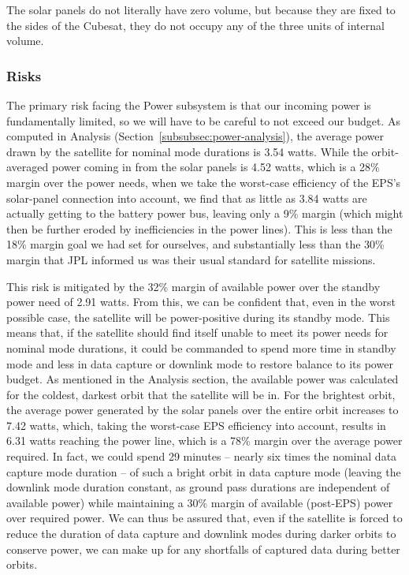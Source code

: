 \documentclass[12pt]{article}
\begin{document}
The solar panels do not literally have zero volume, but because they are fixed to the sides of the Cubesat, they do not occupy any of the three units of internal volume.

			\subsubsection{Risks}

The primary risk facing the Power subsystem is that our incoming power is fundamentally limited, so we will have to be careful to not exceed our budget.  As computed in Analysis (Section~\ref{subsubsec:power-analysis}), the average power drawn by the satellite for nominal mode durations is 3.54 watts.  While the orbit-averaged power coming in from the solar panels is 4.52 watts, which is a 28\% margin over the power needs, when we take the worst-case efficiency of the EPS's solar-panel connection into account\cite{EPS manual}, we find that as little as 3.84 watts are actually getting to the battery power bus, leaving only a 9\% margin (which might then be further eroded by inefficiencies in the power lines).  This is less than the 18\% margin goal we had set for ourselves, and substantially less than the 30\% margin that JPL informed us was their usual standard for satellite missions.

This risk is mitigated by the 32\% margin of available power over the standby power need of 2.91 watts.  From this, we can be confident that, even in the worst possible case, the satellite will be power-positive during its standby mode.  This means that, if the satellite should find itself unable to meet its power needs for nominal mode durations, it could be commanded to spend more time in standby mode and less in data capture or downlink mode to restore balance to its power budget.  As mentioned in the Analysis section, the available power was calculated for the coldest, darkest orbit that the satellite will be in.  For the brightest orbit, the average power generated by the solar panels over the entire orbit increases to 7.42 watts, which, taking the worst-case EPS efficiency into account, results in 6.31 watts reaching the power line, which is a 78\% margin over the average power required.  In fact, we could spend 29 minutes -- nearly six times the nominal data capture mode duration -- of such a bright orbit in data capture mode (leaving the downlink mode duration constant, as ground pass durations are independent of available power) while maintaining a 30\% margin of available (post-EPS) power over required power.  We can thus be assured that, even if the satellite is forced to reduce the duration of data capture and downlink modes during darker orbits to conserve power, we can make up for any shortfalls of captured data during better orbits.
\end{document}
